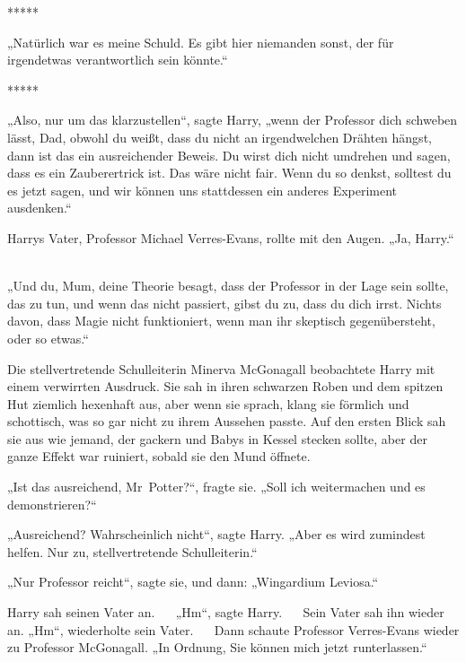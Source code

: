

\hypertarget{alles-was-ich-glaubte-ist-falsch.}{%

*****

„Natürlich war es meine Schuld. Es gibt hier niemanden sonst, der für irgendetwas verantwortlich sein könnte.“ ~ ~

*****

„Also, nur um das klarzustellen“, sagte Harry, „wenn der Professor dich schweben lässt, Dad, obwohl du weißt, dass du nicht an irgendwelchen Drähten hängst, dann ist das ein ausreichender Beweis. Du wirst dich nicht umdrehen und sagen, dass es ein Zauberertrick ist. Das wäre nicht fair. Wenn du so denkst, solltest du es jetzt sagen, und wir können uns stattdessen ein anderes Experiment ausdenken.“ ~ ~

Harrys Vater, Professor Michael Verres-Evans, rollte mit den Augen. „Ja, Harry.“ ~

„Und du, Mum, deine Theorie besagt, dass der Professor in der Lage sein sollte, das zu tun, und wenn das nicht passiert, gibst du zu, dass du dich irrst. Nichts davon, dass Magie nicht funktioniert, wenn man ihr skeptisch gegenübersteht, oder so etwas.“

Die stellvertretende Schulleiterin Minerva McGonagall beobachtete Harry mit einem verwirrten Ausdruck. Sie sah in ihren schwarzen Roben und dem spitzen Hut ziemlich hexenhaft aus, aber wenn sie sprach, klang sie förmlich und schottisch, was so gar nicht zu ihrem Aussehen passte. Auf den ersten Blick sah sie aus wie jemand, der gackern und Babys in Kessel stecken sollte, aber der ganze Effekt war ruiniert, sobald sie den Mund öffnete.

„Ist das ausreichend, Mr~Potter?“, fragte sie. „Soll ich weitermachen und es demonstrieren?“ ~ ~

„Ausreichend? Wahrscheinlich nicht“, sagte Harry. „Aber es wird zumindest helfen. Nur zu, stellvertretende Schulleiterin.“

„Nur Professor reicht“, sagte sie, und dann: „Wingardium Leviosa.“ ~ ~

Harry sah seinen Vater an. ~ ~„Hm“, sagte Harry. ~ ~Sein Vater sah ihn wieder an. „Hm“, wiederholte sein Vater. ~ ~Dann schaute Professor Verres-Evans wieder zu Professor McGonagall. „In Ordnung, Sie können mich jetzt runterlassen.“ ~ ~

}
